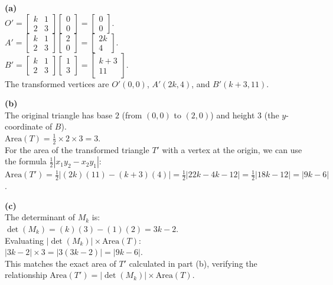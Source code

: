 \begin{solution}
\textbf{(a)} \\
$O' = \begin{bmatrix} k & 1 \\ 2 & 3 \end{bmatrix} \begin{bmatrix} 0 \\ 0 \end{bmatrix} = \begin{bmatrix} 0 \\ 0 \end{bmatrix}$. \\
$A' = \begin{bmatrix} k & 1 \\ 2 & 3 \end{bmatrix} \begin{bmatrix} 2 \\ 0 \end{bmatrix} = \begin{bmatrix} 2k \\ 4 \end{bmatrix}$. \\
$B' = \begin{bmatrix} k & 1 \\ 2 & 3 \end{bmatrix} \begin{bmatrix} 1 \\ 3 \end{bmatrix} = \begin{bmatrix} k+3 \\ 11 \end{bmatrix}$. \\
The transformed vertices are $O'(0,0)$, $A'(2k, 4)$, and $B'(k+3, 11)$.

\medskip
\textbf{(b)} \\
The original triangle has base $2$ (from $(0,0)$ to $(2,0)$) and height $3$ (the $y$-coordinate of $B$). \\
$\text{Area}(T) = \frac{1}{2} \times 2 \times 3 = 3$. \\
For the area of the transformed triangle $T'$ with a vertex at the origin, we can use the formula $\frac{1}{2}|x_1y_2 - x_2y_1|$: \\
$\text{Area}(T') = \frac{1}{2} | (2k)(11) - (k+3)(4) | = \frac{1}{2} | 22k - 4k - 12 | = \frac{1}{2} | 18k - 12 | = | 9k - 6 |$.

\medskip
\textbf{(c)} \\
The determinant of $M_k$ is: \\
$\det(M_k) = (k)(3) - (1)(2) = 3k - 2$. \\
Evaluating $|\det(M_k)| \times \text{Area}(T)$: \\
$|3k - 2| \times 3 = |3(3k - 2)| = |9k - 6|$. \\
This matches the exact area of $T'$ calculated in part (b), verifying the relationship $\text{Area}(T') = |\det(M_k)| \times \text{Area}(T)$.


\end{solution}
